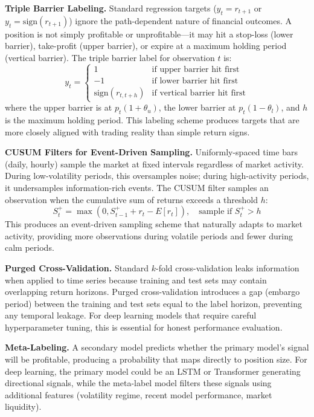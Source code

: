 \documentclass[conference]{IEEEtran}
\begin{document}
\textbf{Triple Barrier Labeling.} Standard regression targets ($y_t = r_{t+1}$ or $y_t = \text{sign}(r_{t+1})$) ignore the path-dependent nature of financial outcomes. A position is not simply profitable or unprofitable---it may hit a stop-loss (lower barrier), take-profit (upper barrier), or expire at a maximum holding period (vertical barrier). The triple barrier label for observation $t$ is:
\begin{equation}
y_t = \begin{cases}
1 & \text{if upper barrier hit first} \\
-1 & \text{if lower barrier hit first} \\
\text{sign}(r_{t,t+h}) & \text{if vertical barrier hit first}
\end{cases}
\end{equation}
where the upper barrier is at $p_t(1 + \theta_u)$, the lower barrier at $p_t(1 - \theta_l)$, and $h$ is the maximum holding period. This labeling scheme produces targets that are more closely aligned with trading reality than simple return signs.

\textbf{CUSUM Filters for Event-Driven Sampling.} Uniformly-spaced time bars (daily, hourly) sample the market at fixed intervals regardless of market activity. During low-volatility periods, this oversamples noise; during high-activity periods, it undersamples information-rich events. The CUSUM filter samples an observation when the cumulative sum of returns exceeds a threshold $h$:
\begin{equation}
S_t^+ = \max(0, S_{t-1}^+ + r_t - E[r_t]), \quad \text{sample if } S_t^+ > h
\end{equation}
This produces an event-driven sampling scheme that naturally adapts to market activity, providing more observations during volatile periods and fewer during calm periods.

\textbf{Purged Cross-Validation.} Standard $k$-fold cross-validation leaks information when applied to time series because training and test sets may contain overlapping return horizons. Purged cross-validation introduces a gap (embargo period) between the training and test sets equal to the label horizon, preventing any temporal leakage. For deep learning models that require careful hyperparameter tuning, this is essential for honest performance evaluation.

\textbf{Meta-Labeling.} A secondary model predicts whether the primary model's signal will be profitable, producing a probability that maps directly to position size. For deep learning, the primary model could be an LSTM or Transformer generating directional signals, while the meta-label model filters these signals using additional features (volatility regime, recent model performance, market liquidity).
\end{document}
